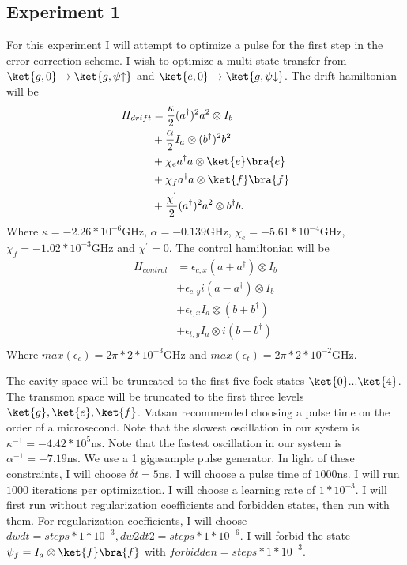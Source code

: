 \documentclass[letterpaper, 12pt]{article}
\begin{document}
\subsection{Experiment 1}
For this experiment I will attempt to optimize a pulse for the first step in the error correction scheme. I wish to optimize a multi-state transfer from $\ket{g, 0} \rightarrow \ket{g, \psi{\uparrow}}$ and $\ket{e, 0} \rightarrow \ket{g, \psi{\downarrow}}$. The drift hamiltonian will be
\begin{align*}
  H_{drift} &= \frac{\kappa}{2} (a^{\dagger})^{2}a^{2} \otimes I_{b}\\
  &+ \frac{\alpha}{2} I_{a} \otimes (b^{\dagger})^{2}b^{2}\\
  &+ \chi_{e} a^{\dagger}a \otimes \ket{e}\bra{e}\\
  &+ \chi_{f} a^{\dagger}a \otimes \ket{f}\bra{f}\\
  &+ \frac{\chi^{'}}{2} (a^{\dagger})^{2}a^{2} \otimes b^{\dagger}b\textrm{.}\\
\end{align*}
Where $\kappa = -2.26* 10^{-6}$GHz, $\alpha = -0.139$GHz, $\chi_{e} = -5.61 * 10^{-4}$GHz, $\chi_{f} = -1.02 * 10^{-3}$GHz and $\chi^{'} = 0$.
The control hamiltonian will be
\begin{align*}
  H_{control} &= \epsilon_{c, x} (a + a^{\dagger}) \otimes I_{b}\\
  &+ \epsilon_{c, y} i(a - a^{\dagger}) \otimes I_{b}\\
  &+ \epsilon_{t, x} I_{a} \otimes (b + b^{\dagger})\\
  &+ \epsilon_{t, y} I_{a} \otimes i(b - b^{\dagger})\\
\end{align*}
Where $max(\epsilon_{c}) = 2\pi * 2 * 10^{-3}$GHz and $max(\epsilon_{t}) = 2\pi * 2 * 10^{-2}$GHz.

The cavity space will be truncated to the first five fock states $\ket{0} ... \ket{4}$. The transmon space will be truncated to the first three levels $\ket{g}, \ket{e}, \ket{f}$. Vatsan recommended choosing a pulse time on the order of a microsecond. Note that the slowest oscillation in our system is $\kappa^{-1} = -4.42 * 10^{5}$ns. Note that the fastest oscillation in our system is $\alpha^{-1} = -7.19$ns. We use a 1 gigasample pulse generator. In light of these constraints, I will choose $\delta t = 5$ns. I will choose a pulse time of $1000$ns. I will run $1000$ iterations per optimization. I will choose a learning rate of $1*10^{-3}$. I will first run without regularization coefficients and forbidden states, then run with them. For regularization coefficients, I will choose $dwdt = steps * 1 * 10^{-3}, dw2dt2 = steps * 1 * 10^{-6}$. I will forbid the state $\psi_{f} = I_{a} \otimes \ket{f}\bra{f}$ with $forbidden = steps * 1 * 10^{-3}$.
\end{document}
